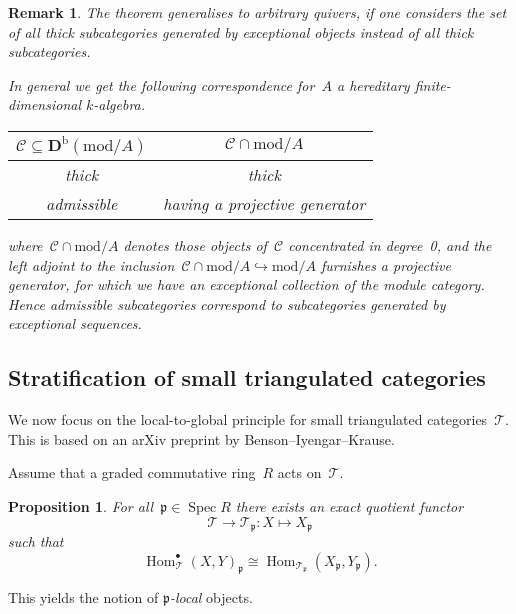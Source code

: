 \documentclass[10pt,a4paper]{article}
\theoremstyle{lecture}
\newtheorem{proposition}[theorem]{Proposition}
\newtheorem{remark}[theorem]{Remark}
\newcommand\dash{\nobreakdash-\hspace{0pt}}
\newcommand\bounded{\ensuremath{\mathrm{b}}}
\newcommand\derived{\ensuremath{\mathbf{D}}}
\DeclareMathOperator\Hom{Hom}
\DeclareMathOperator\Spec{Spec}
\begin{document}
\begin{remark}
  The theorem generalises to arbitrary quivers, if one considers the set of all thick subcategories generated by exceptional objects instead of all thick subcategories.

  In general we get the following correspondence for~$A$ a hereditary finite-dimensional $k$\dash algebra.

  \begin{center}
    \begin{tabular}{cc}
      \toprule
      $\mathcal{C}\subseteq\derived^\bounded(\mathrm{mod}/A)$ & $\mathcal{C}\cap\mathrm{mod}/A$ \\\midrule
      thick & thick \\
      admissible & having a projective generator \\
      \bottomrule
    \end{tabular}
  \end{center}

  where~$\mathcal{C}\cap\mathrm{mod}/A$ denotes those objects of~$\mathcal{C}$ concentrated in degree~0, and the left adjoint to the inclusion~$\mathcal{C}\cap\mathrm{mod}/A\hookrightarrow\mathrm{mod}/A$ furnishes a projective generator, for which we have an exceptional collection of the module category. Hence admissible subcategories correspond to subcategories generated by exceptional sequences.
\end{remark}


\subsection{Stratification of small triangulated categories}
We now focus on the local-to-global principle for small triangulated categories~$\mathcal{T}$. This is based on an arXiv preprint by Benson--Iyengar--Krause.

Assume that a graded commutative ring~$R$ acts on~$\mathcal{T}$.
\begin{proposition}
  For all~$\mathfrak{p}\in\Spec R$ there exists an exact quotient functor
  \begin{equation}
    \mathcal{T}\to\mathcal{T}_{\mathfrak{p}}:X\mapsto X_{\mathfrak{p}}
  \end{equation}
  such that
  \begin{equation}
    \Hom_{\mathcal{T}}^\bullet(X,Y)_{\mathfrak{p}}\cong\Hom_{\mathcal{T}_{\mathfrak{p}}}(X_{\mathfrak{p}},Y_{\mathfrak{p}}).
  \end{equation}
\end{proposition}
This yields the notion of \emph{$\mathfrak{p}$\dash local} objects.
\end{document}
